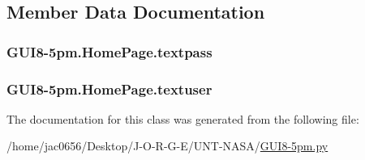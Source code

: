\subsection{Member Data Documentation}
\subsubsection[{\texorpdfstring{textpass}{textpass}}]{\setlength{\rightskip}{0pt plus 5cm}G\+U\+I8-\/5pm.\+Home\+Page.\+textpass}\hypertarget{classGUI8-5pm_1_1HomePage_a9d8ee437ded9432047e0541bc9c38bbd}{}\label{classGUI8-5pm_1_1HomePage_a9d8ee437ded9432047e0541bc9c38bbd}
\subsubsection[{\texorpdfstring{textuser}{textuser}}]{\setlength{\rightskip}{0pt plus 5cm}G\+U\+I8-\/5pm.\+Home\+Page.\+textuser}\hypertarget{classGUI8-5pm_1_1HomePage_ace0000b1905ef123db0ffb0f7712ae43}{}\label{classGUI8-5pm_1_1HomePage_ace0000b1905ef123db0ffb0f7712ae43}


The documentation for this class was generated from the following file\+:\begin{DoxyCompactItemize}
\item 
/home/jac0656/\+Desktop/\+J-\/\+O-\/\+R-\/\+G-\/\+E/\+U\+N\+T-\/\+N\+A\+S\+A/\hyperlink{GUI8-5pm_8py}{G\+U\+I8-\/5pm.\+py}\end{DoxyCompactItemize}
